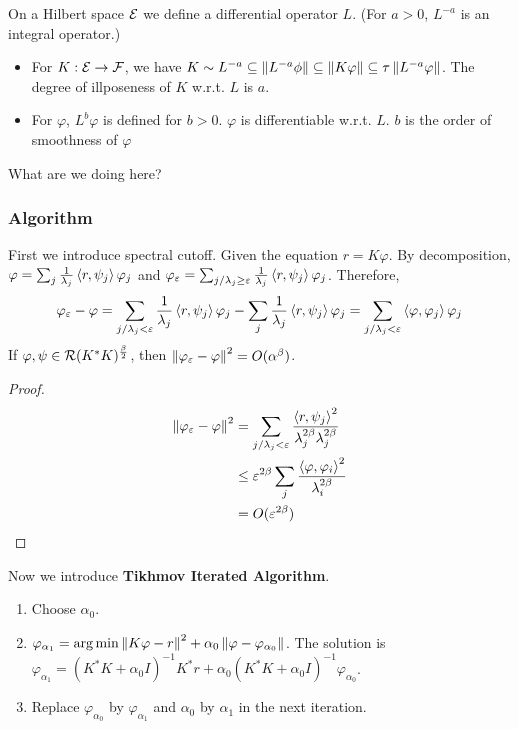 \begin{example}
    On a Hilbert space $\mathcal{E}$ we define a differential operator $L$. (For $a>0$, $L^{-a}$ is an integral operator.)
    \begin{itemize}
        \item For $K: \mathcal{E} \to \mathcal{F}$, we have $K\sim L^{-a} \subseteq
                  \left\| L^{-a}\phi \right\|\subseteq \left\| K\varphi \right\|\subseteq \tau \left\| L^{-a}\varphi \right\|$.
              The degree of illposeness of $K$ w.r.t. $L$ is $a$.
        \item For $\varphi$, $L^b\varphi$ is defined for $b>0$. $\varphi$ is differentiable
              w.r.t. $L$. $b$ is the order of smoothness of $\varphi$
    \end{itemize}
    {\color{red} What are we doing here?}
\end{example}

\subsubsection{Algorithm}
First we introduce spectral cutoff. Given the equation $r=K\varphi$. By
decomposition, $\varphi=\sum_j \frac{1}{\lambda_j}\left\langle r,\psi_j\right\rangle\varphi_j$ and
$\varphi_\varepsilon=\sum_{j/\lambda_j\ge
        \varepsilon}\frac{1}{\lambda_j}\left\langle r,\psi_j\right\rangle\varphi_j$. Therefore, \begin{equation*}
    \varphi_\varepsilon-\varphi=\sum_{j/\lambda_j<\varepsilon}\frac{1}{\lambda_j}\left\langle r,\psi_j\right\rangle\varphi_j-\sum_j \frac{1}{\lambda_j}\left\langle r,\psi_j\right\rangle\varphi_j=\sum_{j/\lambda_j<\varepsilon}\left\langle \varphi,\varphi_j\right\rangle\varphi_j
\end{equation*}
If $\varphi,\psi \in \mathcal{R}(K^*K)^{\frac{\beta}{2}}$, then $\left\| \varphi_\varepsilon-\varphi \right\|^2=O(\alpha^\beta)$.
\begin{proof}
    \begin{equation*}
        \begin{split}
            \left\| \varphi_\varepsilon-\varphi \right\|^2&=\sum_{j/\lambda_j<\varepsilon}\frac{\left\langle r,\psi_j\right\rangle^2}{\lambda_j^{2\beta}\lambda_j^{2\beta}}\\
            &\le \varepsilon^{2\beta} \sum_j \frac{\left\langle \varphi,\varphi_i\right\rangle^2}{\lambda_i^{2\beta}}\\
            &=O(\varepsilon^{2\beta})
        \end{split}
    \end{equation*}
\end{proof}
Now we introduce \textbf{Tikhmov Iterated Algorithm}.
\begin{enumerate}
    \item Choose $\alpha_0$.
    \item $\varphi_{\alpha_1}=\operatorname*{arg\,min} \left\| K\varphi-r \right\|^2+\alpha_0\left\| \varphi-\varphi_{\alpha_0} \right\|$. The solution is $\varphi_{\alpha_1}=(K^*K+\alpha_0 I)^{-1}K^*r+\alpha_0(K^*K+\alpha_0 I)^{-1}\varphi_{\alpha_0}$.
    \item Replace $\varphi_{\alpha_0}$ by $\varphi_{\alpha_1}$ and $\alpha_0$ by
          $\alpha_1$ in the next iteration.
\end{enumerate}


